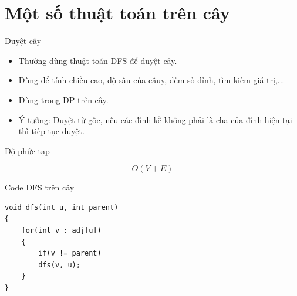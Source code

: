 \documentclass[aspectratio=169]{beamer}
\begin{document}
\section{Một số thuật toán trên cây}

\begin{frame}{Duyệt cây}

\begin{itemize}

\item Thường dùng thuật toán DFS để duyệt cây.
\item Dùng để tính chiều cao, độ sâu của câuy, đếm số đỉnh, tìm kiếm giá trị,...
\item Dùng trong DP trên cây.
\item Ý tưởng: Duyệt từ gốc, nếu các đỉnh kề không phải là cha của đỉnh hiện tại thì tiếp tục duyệt.

\end{itemize}

\begin{block}{Độ phức tạp}

\[
O(V+E)
\]

\end{block}

\end{frame}

\begin{frame}[fragile]{Code DFS trên cây}

\begin{verbatim}
void dfs(int u, int parent)
{
    for(int v : adj[u])
    {
        if(v != parent)
        dfs(v, u);
    }
}
\end{verbatim}

\end{frame}
\end{document}
